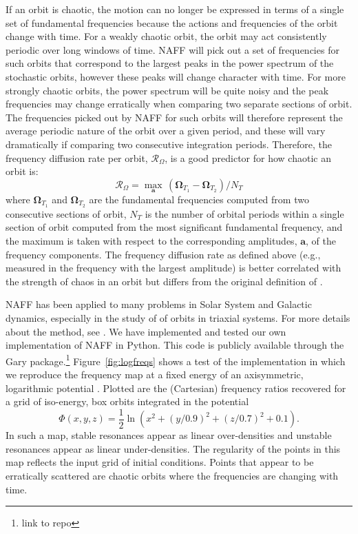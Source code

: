 \documentclass[letterpaper,12pt,preprint]{aastex}
\newcommand{\bs}[1]{\boldsymbol{#1}}
\newcommand{\fdrate}{\mathcal{R}_\Omega}
\begin{document}
If an orbit is chaotic, the motion can no longer be expressed in terms of a single set of fundamental frequencies because the actions and frequencies of the orbit change with time. For a weakly chaotic orbit, the orbit may act consistently periodic over long windows of time. NAFF will pick out a set of frequencies for such orbits that correspond to the largest peaks in the power spectrum of the stochastic orbits, however these peaks will change character with time. For more strongly chaotic orbits, the power spectrum will be quite noisy and the peak frequencies may change erratically when comparing two separate sections of orbit. The frequencies picked out by NAFF for such orbits will therefore represent the average periodic nature of the orbit over a given period, and these will vary dramatically if comparing two consecutive integration periods. Therefore, the frequency diffusion rate per orbit, $\fdrate$, is a good predictor for how chaotic an orbit is:
\begin{equation}
	\fdrate = \max_{\bs{a}} \, (\bs{\Omega}_{T_1} - \bs{\Omega}_{T_2}) / N_T \label{eq:fdrate}
\end{equation}
where $\bs{\Omega}_{T_1}$ and $\bs{\Omega}_{T_2}$ are the fundamental frequencies computed from two consecutive sections of orbit, $N_T$ is the number of orbital periods within a single section of orbit computed from the most significant fundamental frequency, and the maximum is taken with respect to the corresponding amplitudes, $\bs{a}$, of the frequency components. The frequency diffusion rate as defined above (e.g., measured in the frequency with the largest amplitude) is better correlated with the strength of chaos in an orbit \citep{valluri??} but differs from the original definition of \cite{valluri98}.

NAFF has been applied to many problems in Solar System and Galactic dynamics, especially in the study of of orbits in triaxial systems. For more details about the method, see \cite{papaphilippou96, laskar, etc.}. We have implemented and tested our own implementation of NAFF in Python. This code is publicly available through the Gary package.\footnote{link to repo} Figure~\ref{fig:logfreqs} shows a test of the implementation in which we reproduce the frequency map at a fixed energy of an axisymmetric, logarithmic potential \cite[][pg. 260, Figure~3.45]{binneytremaine}. Plotted are the (Cartesian) frequency ratios recovered for a grid of iso-energy, box orbits integrated in the potential
\begin{equation}
	\Phi(x,y,z) = \frac{1}{2}\ln\left(x^2 + (y/0.9)^2 + (z/0.7)^2 + 0.1\right). \label{eq:logpotential}
\end{equation}
In such a map, stable resonances appear as linear over-densities and unstable resonances appear as linear under-densities. The regularity of the points in this map reflects the input grid of initial conditions. Points that appear to be erratically scattered are chaotic orbits where the frequencies are changing with time.
\end{document}
